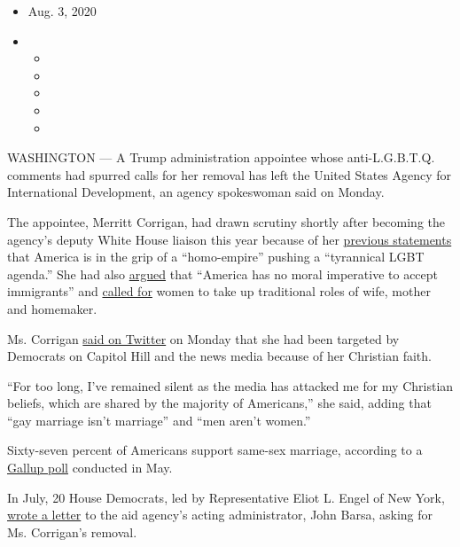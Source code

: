 \begin{itemize}
\item
  Aug. 3, 2020
\item
  \begin{itemize}
  \item
  \item
  \item
  \item
  \item
  \end{itemize}
\end{itemize}

WASHINGTON --- A Trump administration appointee whose anti-L.G.B.T.Q.
comments had spurred calls for her removal has left the United States
Agency for International Development, an agency spokeswoman said on
Monday.

The appointee, Merritt Corrigan, had drawn scrutiny shortly after
becoming the agency's deputy White House liaison this year because of
her
\href{https://www.propublica.org/article/new-trump-appointee-to-foreign-aid-agency-has-denounced-liberal-democracy-and-our-homo-empire}{previous
statements} that America is in the grip of a ``homo-empire'' pushing a
``tyrannical LGBT agenda.'' She had also
\href{https://www.cnn.com/2020/06/29/politics/merritt-corrigan-usaid/index.html}{argued}
that ``America has no moral imperative to accept immigrants'' and
\href{https://conservativewoman.co.uk/home-where-women-will-find-true-liberation/}{called
for} women to take up traditional roles of wife, mother and homemaker.

Ms. Corrigan
\href{https://twitter.com/MerrittCorrigan/status/1290310476673347584?s=20}{said
on Twitter} on Monday that she had been targeted by Democrats on Capitol
Hill and the news media because of her Christian faith.

``For too long, I've remained silent as the media has attacked me for my
Christian beliefs, which are shared by the majority of Americans,'' she
said, adding that ``gay marriage isn't marriage'' and ``men aren't
women.''

Sixty-seven percent of Americans support same-sex marriage, according to
a
\href{https://news.gallup.com/poll/311672/support-sex-marriage-matches-record-high.aspx}{Gallup
poll} conducted in May.

In July, 20 House Democrats, led by Representative Eliot L. Engel of New
York,
\href{https://foreignaffairs.house.gov/_cache/files/5/1/51d34be5-55fb-46bc-b652-fa2e0f86209b/FBA263E0FD66495029120654978C46CE.7-22-2020-ele-letter-to-barsa-on-corrigan.pdf}{wrote
a letter} to the aid agency's acting administrator, John Barsa, asking
for Ms. Corrigan's removal.

